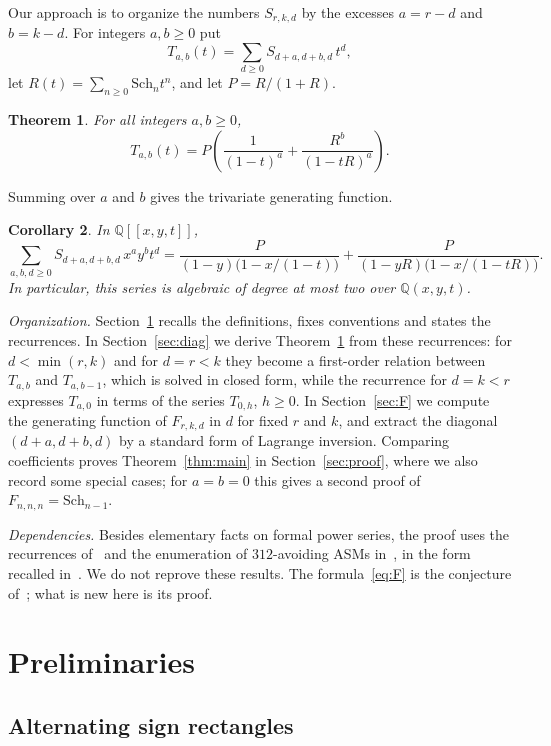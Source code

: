 \documentclass{amsart}
\newtheorem{theorem}{Theorem}[section]
\newtheorem{corollary}[theorem]{Corollary}
\theoremstyle{definition}
\theoremstyle{remark}
\numberwithin{equation}{section}
\newcommand{\Q}{\mathbb{Q}}
\newcommand{\Sch}{\mathrm{Sch}}
\begin{document}
Our approach is to organize the numbers $S_{r,k,d}$ by the excesses $a=r-d$ and $b=k-d$. For integers $a,b\ge0$ put
\[
T_{a,b}(t)=\sum_{d\ge0}S_{d+a,d+b,d}\,t^d,
\]
let $R(t)=\sum_{n\ge0}\Sch_n t^n$, and let $P=R/(1+R)$.

\begin{theorem}\label{thm:diag}
For all integers $a,b\ge0$,
\[
T_{a,b}(t)=P\left(\frac{1}{(1-t)^{a}}+\frac{R^b}{(1-tR)^{a}}\right).
\]
\end{theorem}

Summing over $a$ and $b$ gives the trivariate generating function.

\begin{corollary}\label{cor:trivariate}
In $\Q[[x,y,t]]$,
\[
\sum_{a,b,d\ge0}S_{d+a,d+b,d}\,x^ay^bt^d=\frac{P}{(1-y)\bigl(1-x/(1-t)\bigr)}+\frac{P}{(1-yR)\bigl(1-x/(1-tR)\bigr)}.
\]
In particular, this series is algebraic of degree at most two over $\Q(x,y,t)$.
\end{corollary}

\emph{Organization.} Section~\ref{sec:prelim} recalls the definitions, fixes conventions and states the recurrences. In Section~\ref{sec:diag} we derive Theorem~\ref{thm:diag} from these recurrences: for $d<\min(r,k)$ and for $d=r<k$ they become a first-order relation between $T_{a,b}$ and $T_{a,b-1}$, which is solved in closed form, while the recurrence for $d=k<r$ expresses $T_{a,0}$ in terms of the series $T_{0,h}$, $h\ge0$. In Section~\ref{sec:F} we compute the generating function of $F_{r,k,d}$ in $d$ for fixed $r$ and $k$, and extract the diagonal $(d+a,d+b,d)$ by a standard form of Lagrange inversion. Comparing coefficients proves Theorem~\ref{thm:main} in Section~\ref{sec:proof}, where we also record some special cases; for $a=b=0$ this gives a second proof of $F_{n,n,n}=\Sch_{n-1}$.

\emph{Dependencies.} Besides elementary facts on formal power series, the proof uses the recurrences of~\cite[Propositions~4.2 and~4.3, Theorem~4.4]{HKL} and the enumeration of $312$-avoiding ASMs in~\cite{JL07}, in the form recalled in~\cite[Sections~3 and~4]{HKL}. We do not reprove these results. The formula~\eqref{eq:F} is the conjecture of~\cite{HKL}; what is new here is its proof.

\section{Preliminaries}\label{sec:prelim}

\subsection{Alternating sign rectangles}
\end{document}
